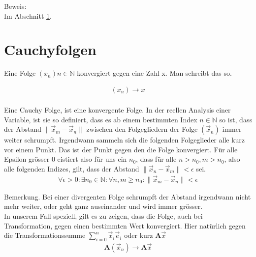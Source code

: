 \documentclass[a4paper]{article}
\begin{document}
\begin{example}
Beweis:\\

Im Abschnitt \ref{Cauchy_Folgen}.

\section{Cauchyfolgen}
\label{Cauchy_Folgen}

Eine Folge $(x_n)n\in\mathbb{N}$ konvergiert gegen eine Zahl x. Man schreibt das so.

\begin{displaymath}
\begin{align}
    (x_n) \rightarrow x\\
\end{align}
\end{displaymath}
    

Eine Cauchy Folge, ist eine konvergente Folge. In der reellen Analysis einer Variable, ist sie so definiert, dass es ab einem bestimmten Index $n \in \mathbb{N}$ so ist, dass der Abstand $\|\vec{x}_m - \vec{x}_n\|$ zwischen den Folgegliedern der Folge $(\vec{x}_n)$ immer weiter schrumpft. Irgendwann sammeln sich die folgenden Folgeglieder alle kurz vor einem Punkt. Das ist der Punkt gegen den die Folge konvergiert. F\"ur alle Epsilon gr\"osser $0$ eistiert also f\"ur uns ein $n_0$, dass f\"ur alle $n > n_0 , m > n_0$, also alle folgenden Indizes, gilt, dass der Abstand $\|\vec{x}_n - \vec{x}_m\| < \epsilon$ sei.\\

\begin{displaymath}
\begin{align}
\forall \epsilon > 0 : \exists n_{0} \in \mathbb{N} : \forall n,m \geq n_{0} : \|\vec{x}_{m}-\vec{x}_{n}\| < \epsilon
\end{align}
\end{displaymath}

Bemerkung. Bei einer divergenten Folge schrumpft der Abstand irgendwann nicht mehr weiter, oder geht ganz auseinander und wird immer gr\"osser.\\

In unserem Fall speziell, gilt es zu zeigen, dass die Folge, auch bei Transformation, gegen einen bestimmten Wert konvergiert.
Hier nat\"urlich gegen die Transformationssumme $\sum_{i=0}^{n}\vec{x}_i\vec{e}_i$ oder kurz $\boldsymbol{A}\vec{x}$\\

\begin{displaymath}
\begin{align}
    \boldsymbol{A}(\vec{x}_n) \rightarrow \boldsymbol{A}\vec{x}\\
\end{align}
\end{displaymath}



\end{example}
\end{document}

